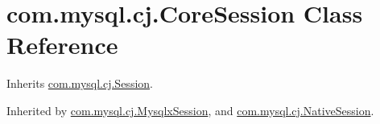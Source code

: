 \hypertarget{classcom_1_1mysql_1_1cj_1_1_core_session}{}\section{com.\+mysql.\+cj.\+Core\+Session Class Reference}
\label{classcom_1_1mysql_1_1cj_1_1_core_session}


Inherits \mbox{\hyperlink{interfacecom_1_1mysql_1_1cj_1_1_session}{com.\+mysql.\+cj.\+Session}}.



Inherited by \mbox{\hyperlink{classcom_1_1mysql_1_1cj_1_1_mysqlx_session}{com.\+mysql.\+cj.\+Mysqlx\+Session}}, and \mbox{\hyperlink{classcom_1_1mysql_1_1cj_1_1_native_session}{com.\+mysql.\+cj.\+Native\+Session}}.

